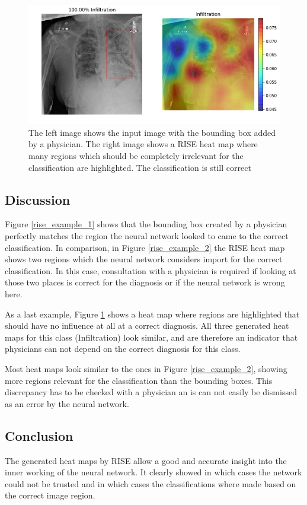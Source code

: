 \begin{figure}[H]
\centering
\includegraphics[width=12cm]{chapters/03_classification/images/rise_8.png}
\caption{The left image shows the input image with the bounding box added by a physician. The right image shows a RISE heat map where many regions which should be completely irrelevant for the classification are highlighted. The classification is still correct}
\label{rise_example_3}
\end{figure}

\subsection{Discussion}
Figure \ref{rise_example_1} shows that the bounding box created by a physician perfectly matches the region the neural network looked to came to the correct classification. In comparison, in Figure \ref{rise_example_2} the RISE heat map shows two regions which the neural network considers import for the correct classification. In this case, consultation with a physician is required if looking at those two places is correct for the diagnosis or if the neural network is wrong here.

As a last example, Figure \ref{rise_example_3} shows a heat map where regions are highlighted that should have no influence at all at a correct diagnosis. All three generated heat maps for this class (Infiltration) look similar, and are therefore an indicator that physicians can not depend on the correct diagnosis for this class.

Most heat maps look similar to the ones in Figure \ref{rise_example_2}, showing more regions relevant for the classification than the bounding boxes. This discrepancy has to be checked with a physician an is can not easily be dismissed as an error by the neural network.

\subsection{Conclusion}
The generated heat maps by RISE allow a good and accurate insight into the inner working of the neural network. It clearly showed in which cases the network could not be trusted and in which cases the classifications where made based on the correct image region.
